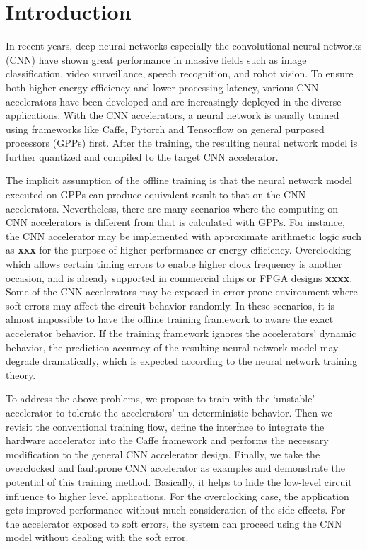 \section{Introduction} \label{sec:intro}
In recent years, deep neural networks especially the convolutional neural networks (CNN) 
have shown great performance in massive fields such as image classification, 
video surveillance, speech recognition, and robot vision. To ensure both 
higher energy-efficiency and lower processing latency, various CNN accelerators 
\cite{pipecnn_2,Zhang2015_9,Qiu2016_10,deepburing_12,Farabet2010_13,Zeng2018_18} 
have been developed and are increasingly deployed in the diverse applications. 
With the CNN accelerators, a neural network is usually trained 
using frameworks like Caffe, Pytorch and Tensorflow on general purposed 
processors (GPPs) first. After the training, the resulting neural network 
model is further quantized and compiled to the target CNN accelerator. 

The implicit assumption of the offline training is that the neural 
network model executed on GPPs can produce equivalent result to 
that on the CNN accelerators. Nevertheless, there are 
many scenarios where the computing on CNN accelerators 
is different from that is calculated with GPPs. For instance, the 
CNN accelerator may be implemented with approximate arithmetic logic 
such as \textbf{xxx} for the purpose of higher performance or energy efficiency. 
Overclocking  \cite{overclock_3,Razor_15} which allows certain 
timing errors to enable higher clock frequency
is another occasion, and is already supported in commercial chips 
or FPGA designs \textbf{xxxx}. Some of the CNN accelerators may be 
exposed in error-prone environment where soft errors 
may affect the circuit behavior randomly. 
In these scenarios, it is almost impossible to have the offline training 
framework to aware the exact accelerator behavior. 
If the training framework ignores the accelerators’ dynamic 
behavior, the prediction accuracy of the resulting neural 
network model may degrade dramatically, which is expected according to 
the neural network training theory.

To address the above problems, we propose to train 
with the ‘unstable’ accelerator to tolerate the accelerators’ un-deterministic behavior. 
Then we revisit the conventional training flow, define the interface to integrate the 
hardware accelerator into the Caffe framework and performs the necessary modification 
to the general CNN accelerator design. Finally, we take the overclocked and faultprone 
CNN accelerator as examples and demonstrate the potential of this training method. 
Basically, it helps to hide the low-level circuit influence to higher level applications. 
For the overclocking case, the application gets improved performance without much 
consideration of the side effects. For the accelerator exposed to soft errors, the 
system can proceed using the CNN model without dealing with the soft error.  

